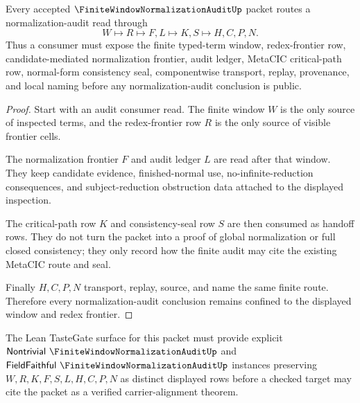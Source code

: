 \begin{theorem}
\label{thm:finite-window-normalization-audit-redex-frontier}
Every accepted $\FiniteWindowNormalizationAuditUp$ packet routes a normalization-audit read through
$$
W \longmapsto R \longmapsto F,L \longmapsto K,S \longmapsto H,C,P,N .
$$
Thus a consumer must expose the finite typed-term window, redex-frontier row, candidate-mediated normalization frontier, audit ledger, MetaCIC critical-path row, normal-form consistency seal, componentwise transport, replay, provenance, and local naming before any normalization-audit conclusion is public.
\end{theorem}
\begin{proof}
Start with an audit consumer read. The finite window $W$ is the only source of inspected terms, and the redex-frontier row $R$ is the only source of visible frontier cells.

The normalization frontier $F$ and audit ledger $L$ are read after that window. They keep candidate evidence, finished-normal use, no-infinite-reduction consequences, and subject-reduction obstruction data attached to the displayed inspection.

The critical-path row $K$ and consistency-seal row $S$ are then consumed as handoff rows. They do not turn the packet into a proof of global normalization or full closed consistency; they only record how the finite audit may cite the existing MetaCIC route and seal.

Finally $H,C,P,N$ transport, replay, source, and name the same finite route. Therefore every normalization-audit conclusion remains confined to the displayed window and redex frontier.
\end{proof}



The Lean TasteGate surface for this packet must provide explicit $\mathsf{Nontrivial}\ \FiniteWindowNormalizationAuditUp$ and $\mathsf{FieldFaithful}\ \FiniteWindowNormalizationAuditUp$ instances preserving $W,R,K,F,S,L,H,C,P,N$ as distinct displayed rows before a checked target may cite the packet as a verified carrier-alignment theorem.

